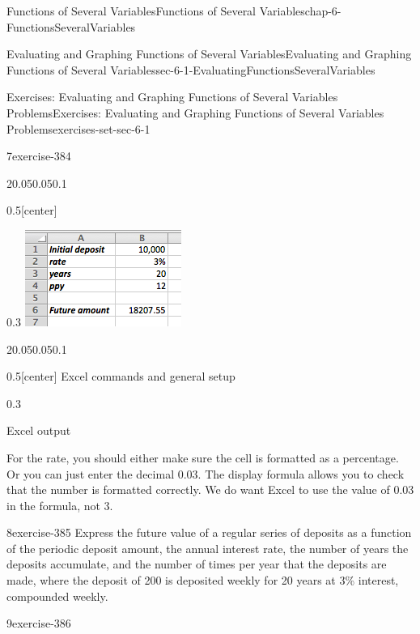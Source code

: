 \documentclass[oneside,10pt,]{book}
\numberwithin{equation}{section}
\begin{document}
\begin{chapterptx}{Functions of Several Variables}{}{Functions of Several Variables}{}{}{chap-6-FunctionsSeveralVariables}
\begin{sectionptx}{Evaluating and Graphing Functions of Several Variables}{}{Evaluating and Graphing Functions of Several Variables}{}{}{sec-6-1-EvaluatingFunctionsSeveralVariables}
\begin{exercises-subsection-numberless}{Exercises: Evaluating and Graphing Functions of Several Variables Problems}{}{Exercises: Evaluating and Graphing Functions of Several Variables Problems}{}{}{exercises-set-sec-6-1}
\begin{exercisegroup}
\begin{divisionexerciseeg}{7}{}{}{exercise-384}
\begin{sidebyside}{2}{0.05}{0.05}{0.1}
\begin{sbspanel}{0.5}[center]
\end{sbspanel}%
\begin{sbspanel}{0.3}%
\includegraphics[width=1\linewidth]{images/sec6-1-sol7b.png}
\end{sbspanel}%
\end{sidebyside}%
\begin{sidebyside}{2}{0.05}{0.05}{0.1}%
\begin{sbspanel}{0.5}[center]%
\hypertarget{p-2174}{}%
Excel commands  and general setup%
\end{sbspanel}%
\begin{sbspanel}{0.3}%
\par
\hypertarget{p-2175}{}%
Excel output%
\end{sbspanel}%
\end{sidebyside}%
\par
\hypertarget{p-2176}{}%
For the rate, you should either make sure the cell is formatted as a percentage. Or you can just enter the decimal 0.03. The display formula allows you to check that the number is formatted correctly. We do want Excel to use the value of 0.03 in the formula, not 3.%
\end{divisionexerciseeg}%
\begin{divisionexerciseeg}{8}{}{}{exercise-385}%
\hypertarget{p-2177}{}%
Express the future value of a regular series of deposits as a function of the periodic deposit amount, the annual interest rate, the number of years the deposits accumulate, and the number of times per year that the deposits are made, where the deposit of \textdollar{}200 is deposited weekly for 20 years at 3\% interest, compounded weekly.%
\end{divisionexerciseeg}%
\begin{divisionexerciseeg}{9}{}{}{exercise-386}%

\end{divisionexerciseeg}
\end{exercisegroup}
\end{exercises-subsection-numberless}
\end{sectionptx}
\end{chapterptx}
\end{document}
